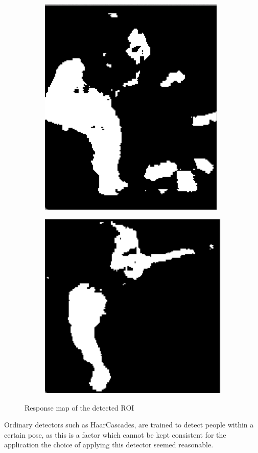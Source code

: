 \begin{figure}[H]
    \centering
    \begin{subfigure}[b]{0.3\textwidth}
    	\centering
			\includegraphics[scale=0.5]{Images/roi_response1.png}
    \end{subfigure}%
    \begin{subfigure}[b]{0.3\textwidth}
    	\centering
			\includegraphics[scale=0.5]{Images/roi_response2.png}
    \end{subfigure}
    \caption{Response map of the  detected ROI}
    \label{fig:responsemap}
\end{figure}

Ordinary detectors such as HaarCascades, are trained to detect people within a certain pose, as this is a factor which cannot be kept consistent for the application the choice of applying this detector seemed reasonable. \\

